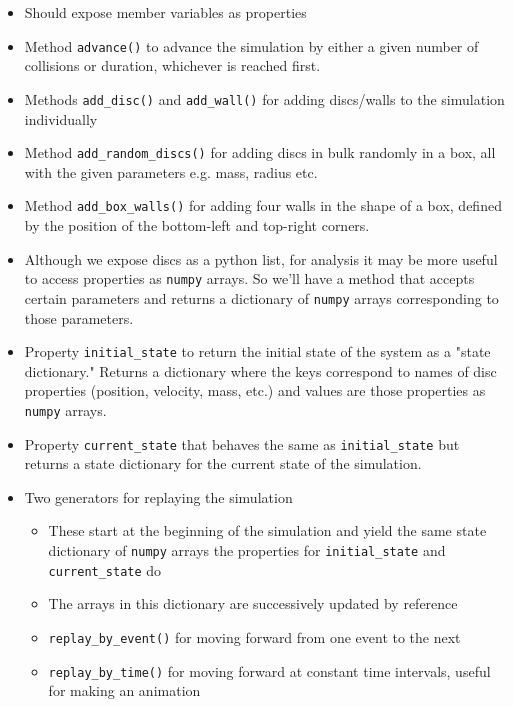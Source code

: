 \documentclass{article}
\begin{document}
\begin{itemize}
    \begin{itemize}
        \item Should expose member variables as properties
        \item Method \texttt{advance()} to advance the simulation by either a given number of collisions or duration, whichever is reached first.
        \item Methods \texttt{add\_disc()} and \texttt{add\_wall()} for adding discs/walls to the simulation individually
        \item Method \texttt{add\_random\_discs()} for adding discs in bulk randomly in a box, all with the given parameters e.g. mass, radius etc.
        \item Method \texttt{add\_box\_walls()} for adding four walls in the shape of a box, defined by the position of the bottom-left and top-right corners.
        \item Although we expose discs as a python list, for analysis it may be more useful to access properties as \texttt{numpy} arrays. So we'll have a method that accepts certain parameters and returns a dictionary of \texttt{numpy} arrays corresponding to those parameters.
        \item Property \texttt{initial\_state} to return the initial state of the system as a "state dictionary." Returns a dictionary where the keys correspond to names of disc properties (position, velocity, mass, etc.) and values are those properties as \texttt{numpy} arrays.
        \item Property \texttt{current\_state} that behaves the same as \texttt{initial\_state} but returns a state dictionary for the current state of the simulation.
        \item Two generators for replaying the simulation
        \begin{itemize}
            \item These start at the beginning of the simulation and yield the same state dictionary of \texttt{numpy} arrays the properties for \texttt{initial\_state} and \texttt{current\_state} do
            \item The arrays in this dictionary are successively updated by reference
            \item \texttt{replay\_by\_event()} for moving forward from one event to the next
            \item \texttt{replay\_by\_time()} for moving forward at constant time intervals, useful for making an animation
        \end{itemize}
    \end{itemize}
\end{itemize}
\end{document}
